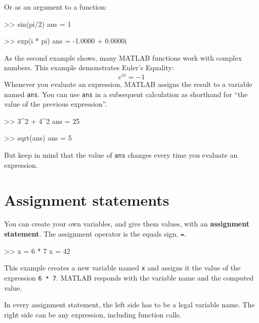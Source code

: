 \documentclass[
]{book}
\numberwithin{Answer}{chapter}
\numberwithin{Exercise}{chapter}
\begin{document}
Or as an argument to a function:

\begin{code}
>> sin(pi/2)
ans = 1

>> exp(i * pi)
ans = -1.0000 + 0.0000i
\end{code}


As the second example shows, many MATLAB functions work with
complex numbers.  This example demonstrates Euler's Equality:
%
\begin{equation*}
e^{i \pi} = -1
\end{equation*}
%
Whenever you evaluate an expression, MATLAB assigns the result to
a variable named {\tt ans}.  You can use {\tt ans} in a subsequent
calculation as shorthand for ``the value of the previous expression''.

\begin{code}
>> 3^2 + 4^2
ans = 25

>> sqrt(ans)
ans = 5
\end{code}

But keep in mind that the value of {\tt ans} changes every time
you evaluate an expression.


\section{Assignment statements}

You can create your own variables, and give them values, with
an {\bf assignment statement}.  The assignment operator is the
equals sign, {\tt =}.


\begin{code}
>> x = 6 * 7
x = 42
\end{code}

This example creates a new variable named {\tt x} and assigns it the
value of the expression {\tt 6 * 7}.  MATLAB responds with the
variable name and the computed value.


In every assignment statement, the left side has to be a legal variable name.  The right side can be any expression, including function calls.

\end{document}
